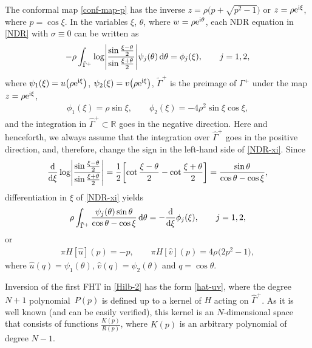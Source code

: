 \documentclass[10pt,a4paper]{amsart}
\numberwithin{equation}{section}
\newcommand{\G}{\Gamma}
\def\R{{\mathbb R}}
\def\r{\rho}
\def\s{ {\sigma}}
\def\th{ {\theta}}
\def\x{\xi}
\def\hf{\frac{1}{2}}
\def\s{\sigma}
\def\G{\Gamma}
\def\r{\rho}
\def\th{\theta}
\begin{document}
The conformal map \eqref{conf-map-p} has the inverse $z=\rho\bigl(p+\sqrt{p^2-1}\bigr)$ or $z=\rho {\rm e}^{{\rm i}\xi}$, where $p=\cos \xi$. In the variables $\xi$, $\th$, where $w=\rho {\rm e}^{{\rm i}\th}$, each NDR equation in \eqref{NDR} with $\s\equiv 0$ can be written as
\begin{gather}\label{NDR-xi}
-\r\int_{\tilde\G^+}\log\Biggl|\frac{\sin \frac{\x-\th}{2}}{\sin \frac{\x+\th}{2}}\Biggr|\psi_j(\th)\,{\rm d}\th=
\phi_j(\xi),\qquad j=1,2,
\end{gather}
where $\psi_1(\xi)=u\bigl(\r {\rm e}^{{\rm i}\xi}\bigr)$, $\psi_2(\xi)=v\bigl(\r {\rm e}^{{\rm i}\xi}\bigr)$, $\tilde\G^+$ is the preimage of $\G^+$ under the map $z=\rho {\rm e}^{{\rm i}\xi}$,
\begin{gather*}%
\phi_1(\xi)= \r\sin\x, \qquad
\phi_2(\xi)= -4\rho^2 \sin\xi\cos\xi,
\end{gather*}
and the integration in $\hat\G^+\subset \R$ goes in the negative direction. Here and henceforth, we always assume that the integration over $\hat\G^+$ goes in the positive direction, and, therefore, change the sign in the left-hand side of \eqref{NDR-xi}.
Since
\begin{gather*}
\frac{{\rm d}}{{\rm d}\x}\log\Biggl|\frac{\sin \frac{\x-\th}{2}}{\sin \frac{\x+\th}{2}}\Biggr|=\hf\biggl[ \cot \frac{\x-\th}{2}- \cot \frac{\x+\th}{2} \biggr]=
\frac{\sin\th}{\cos\th-\cos\x},
\end{gather*}
differentiation in $\x$ of \eqref{NDR-xi} yields
\begin{gather*}%
\r\int_{\tilde\G^+}\frac{\psi_j(\th)\sin\th}{\cos\th-\cos\x}\,{\rm d}\th=
-\frac{{\rm d}}{{\rm d}\xi}\phi_j(\xi),\qquad j=1,2,
\end{gather*}
or
\begin{align}\label{Hilb-2}
\pi H[\hat u](p)=-p,\qquad
\pi H[\hat v](p)=4\rho^{} \bigl(2p^2-1\bigr),
\end{align}
where $\hat u(q)=\psi_1(\th)$, $\hat v(q)=\psi_2(\th)$ and $q=\cos\th$.

Inversion of the first FHT in \eqref{Hilb-2} has the form \eqref{hat-uv}, where the degree $N+1$ polynomial~$P(p)$ is defined up to a kernel of $H$ acting on $\hat\G^+$.
As it is well known (and can be easily verified), this kernel is an $N$-dimensional space that consists of functions $\frac{K(p)}{R(p)}$, where $K(p)$ is an arbitrary
polynomial of degree $N-1$.
\end{document}
